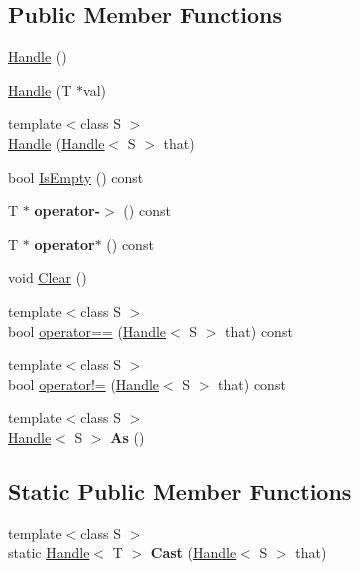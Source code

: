 \subsection*{Public Member Functions}
\begin{DoxyCompactItemize}
\item 
\hyperlink{classv8_1_1_handle_aa7543a3d572565806a66e922634cc2f4}{Handle} ()
\item 
\hyperlink{classv8_1_1_handle_aac16277f1131898a4a2ef664d051cc18}{Handle} (T $\ast$val)
\item 
{\footnotesize template$<$class S $>$ }\\\hyperlink{classv8_1_1_handle_a64aee8fcde243c8a5abebfe534b3797a}{Handle} (\hyperlink{classv8_1_1_handle}{Handle}$<$ S $>$ that)
\item 
bool \hyperlink{classv8_1_1_handle_ab3b20b28e7f672de83a2dc8d6809f815}{Is\+Empty} () const 
\item 
\hypertarget{classv8_1_1_handle_af5285c2e91079e380651f83195383228}{}T $\ast$ {\bfseries operator-\/$>$} () const \label{classv8_1_1_handle_af5285c2e91079e380651f83195383228}

\item 
\hypertarget{classv8_1_1_handle_a524a50d9802a97beb1b5e405c6fc6f21}{}T $\ast$ {\bfseries operator$\ast$} () const \label{classv8_1_1_handle_a524a50d9802a97beb1b5e405c6fc6f21}

\item 
void \hyperlink{classv8_1_1_handle_a452516a09df056438c3d3a177ebd1977}{Clear} ()
\item 
{\footnotesize template$<$class S $>$ }\\bool \hyperlink{classv8_1_1_handle_afcc79738c6fff05c70e958a471f2b7d9}{operator==} (\hyperlink{classv8_1_1_handle}{Handle}$<$ S $>$ that) const 
\item 
{\footnotesize template$<$class S $>$ }\\bool \hyperlink{classv8_1_1_handle_ab550353b4a7bc3ad3df53fe80df7ea61}{operator!=} (\hyperlink{classv8_1_1_handle}{Handle}$<$ S $>$ that) const 
\item 
\hypertarget{classv8_1_1_handle_a1cfaea378fc1a419101d4cc02d34e404}{}{\footnotesize template$<$class S $>$ }\\\hyperlink{classv8_1_1_handle}{Handle}$<$ S $>$ {\bfseries As} ()\label{classv8_1_1_handle_a1cfaea378fc1a419101d4cc02d34e404}

\end{DoxyCompactItemize}
\subsection*{Static Public Member Functions}
\begin{DoxyCompactItemize}
\item 
\hypertarget{classv8_1_1_handle_a78abe2e84ab0829779b714feea1bc4d1}{}{\footnotesize template$<$class S $>$ }\\static \hyperlink{classv8_1_1_handle}{Handle}$<$ T $>$ {\bfseries Cast} (\hyperlink{classv8_1_1_handle}{Handle}$<$ S $>$ that)\label{classv8_1_1_handle_a78abe2e84ab0829779b714feea1bc4d1}

\end{DoxyCompactItemize}


